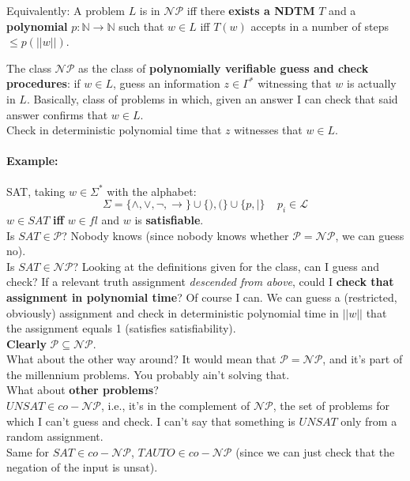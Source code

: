 	Equivalently: A problem $L$ is in $\mathcal{NP}$ iff there \textbf{exists a NDTM} $T$ and a \textbf{polynomial} $p: \mathbb{N} \rightarrow \mathbb{N}$ such that $w \in L$ iff $T(w)$ accepts in a number of steps $\leq p(||w||)$.\\

	\newpage

	The class $\mathcal{NP}$ as the class of \textbf{polynomially verifiable guess and check procedures}: if $w \in L$, guess an information $z \in \Gamma^\ast$ witnessing that $w$ is actually in $L$. Basically, class of problems in which, given an answer I can check that said answer confirms that $w \in L$.\\
	Check in deterministic polynomial time that $z$ witnesses that $w \in L$.\\

	\paragraph{Example:} SAT, taking $w \in \Sigma^\ast$ with the alphabet:
	$$ \Sigma = \{\wedge, \vee, \neg, \rightarrow\} \cup \{),(\} \cup \{p, |\} \;\;\;\; p_i \in \mathcal{L} $$
	$w \in SAT$ \textbf{iff} $w \in fl$ and $w$ is \textbf{satisfiable}.\\

	Is $SAT \in \mathcal{P}$? Nobody knows (since nobody knows whether $\mathcal{P} = \mathcal{NP}$, we can guess no).\\

	Is $SAT \in \mathcal{NP}$? Looking at the definitions given for the class, can I guess and check? If a relevant truth assignment \textit{descended from above}, could I \textbf{check that assignment in polynomial time}? Of course I can. We can guess a (restricted, obviously) assignment and check in deterministic polynomial time in $||w||$ that the assignment equals 1 (satisfies satisfiability).\\

	\textbf{Clearly} $\mathcal{P} \subseteq \mathcal{NP}$.\\
	What about the other way around? It would mean that $\mathcal{P} = \mathcal{NP}$, and it's part of the millennium problems. You probably ain't solving that.\\

	What about \textbf{other problems}? \\

	$UNSAT \in co-\mathcal{NP}$, i.e., it's in the complement of $\mathcal{NP}$, the set of problems for which I can't guess and check. I can't say that something is $UNSAT$ only from a random assignment.\\
	Same for $SAT \in co-\mathcal{NP}$, $TAUTO \in co-\mathcal{NP}$ (since we can just check that the negation of the input is unsat).\\

